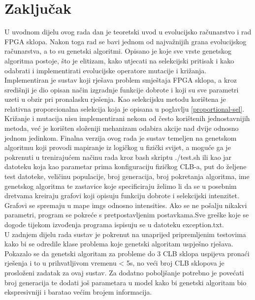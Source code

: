 \documentclass[times, utf8, zavrsni]{fer}
\begin{document}
		
		\chapter{Zaključak}
		
		U uvodnom dijelu ovog rada dan je teoretski uvod u evolucijsko računarstvo i rad FPGA sklopa. Nakon toga rad se bavi jednom od najvažnijih grana evolucijskog računarstva, a to su genetski algoritmi. Opisano je koje sve vrste genetskog algoritma postoje, što je elitizam, kako utjecati na selekcijski pritisak i kako odabrati i implementirati evolucijske operatore mutacije i križanja. \\
		Implementiran je sustav koji rješava problem smještaja FPGA sklopa, a kroz središnji je dio opisan način izgradnje funkcije dobrote i koji su sve parametri uzeti u obzir pri pronalasku rješenja. Kao selekcijsku metodu korištena je relativna proporcionalna selekcija koja je opisana u poglavlju \ref{proportional-sel}. Križanje i mutacija nisu implementirani nekom od često korištenih jednostavnijih metoda, već je korišten složeniji mehanizam odabira akcije nad dvije odnosno jednom jedinkom. Finalna verzija ovog rada je sustav temeljen na genetskom algoritmu koji provodi mapiranje iz logičkog u fizički svijet, a moguće ga je pokrenuti u trenirajućem načinu rada kroz bash skriptu ./test.sh ili kao jar datoteku koja kao parametar prima konfiguraciju fizičkog CLB-a, put do željene test datoteke, veličinu populacije, broj generacija, broj pokretanja algoritma, ime genetskog algoritma te zastavice koje specificiraju želimo li da se u posebnim dretvama kreiraju grafovi koji opisuju funkciju dobrote i selekcijski intenzitet. Grafovi se spremaju u mape imgs odnosno intensities. Ako se ne pošalju nikakvi parametri, program se pokreće s pretpostavljenim postavkama.Sve greške koje se dogode tijekom izvođenja programa ispisuju se u datoteku exception.txt. \\
		U zadnjem dijelu rada sustav je pokrenut na unaprijed pripremljenim testovima kako bi se odredile klase problema koje genetski algoritam uspješno rješava. Pokazalo se da genetski algoritam za probleme do 3 CLB sklopa uspijeva pronaći rješenja i to u prihvatljivom vremenu < 5s, no veći broj CLB sklopova je prosloženi zadatak za ovaj sustav. Za dodatno poboljšanje potrebno je povećati broj generacija te dodati još parametara u model kako bi genetski algoritam bio ekspresivniji i baratao većim brojem informacija.
		
		
		
		
		
\end{document}
